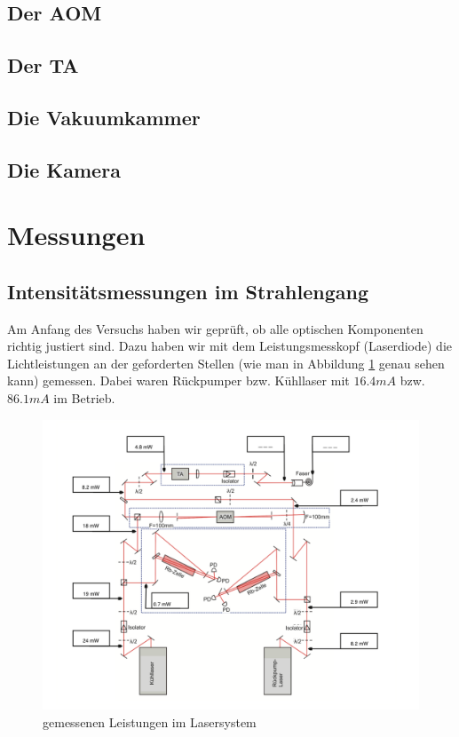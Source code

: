 \documentclass[12pt,a4paper]{article}
\begin{document}
  \subsection{Der AOM}
    
  \subsection{Der TA}
  \subsection{Die Vakuumkammer}
  \subsection{Die Kamera}
\section{Messungen}
  \subsection{Intensitätsmessungen im Strahlengang}
  Am Anfang des Versuchs haben wir geprüft, ob alle optischen Komponenten richtig justiert sind. Dazu haben wir mit dem Leistungsmesskopf (Laserdiode) die Lichtleistungen an der geforderten Stellen (wie man in Abbildung \ref{leistung} genau sehen kann) gemessen. Dabei waren  Rückpumper bzw. Kühllaser mit $16.4 mA$ bzw. $86.1 mA$ im Betrieb.
  
    \begin{figure}[h!]
  \centering
  \includegraphics[width=1.\textwidth]{Strahlenleistungen.png}
  \caption{gemessenen Leistungen im Lasersystem}
  \label{leistung}
  \end{figure}
\end{document}
